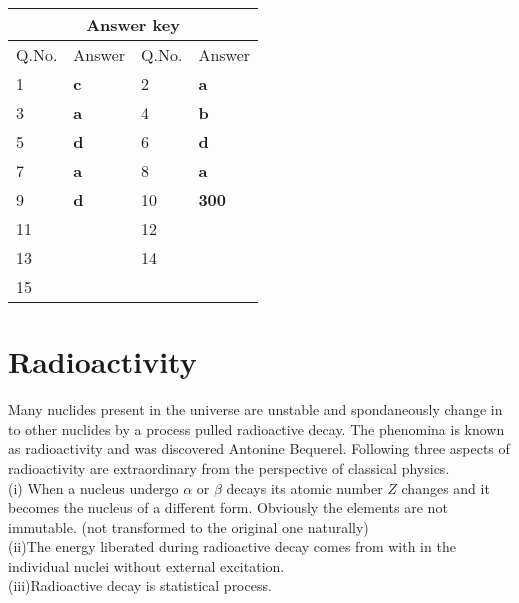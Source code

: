 \begin{table}[H]
	\centering
	\begin{tabular}{|p{1.5cm}|p{1.5cm}||p{1.5cm}|p{1.5cm}|}
		\hline
		\multicolumn{4}{|c|}{\textbf{Answer key}}\\\hline\hline
		\rowcolor{ocrel}Q.No.&Answer&Q.No.&Answer\\\hline
		1&\textbf{c} &2&\textbf{a}\\\hline 
		3&\textbf{a} &4&\textbf{b} \\\hline
		5&\textbf{d} &6&\textbf{d} \\\hline
		7&\textbf{a}&8&\textbf{a}\\\hline
		9&\textbf{d}&10&\textbf{300}\\\hline
		11&\textbf{} &12&\textbf{}\\\hline
		13&\textbf{}&14&\textbf{}\\\hline
		15&\textbf{}& &\\\hline
	\end{tabular}
\end{table}












\newpage
\section{Radioactivity}
Many nuclides present in the universe are unstable and spondaneously change in to other nuclides by a process pulled radioactive decay. The phenomina is known as radioactivity and was discovered Antonine Bequerel. Following three aspects of radioactivity are extraordinary from the perspective of classical physics.\\
(i) \quad When a nucleus undergo $\alpha$ or $\beta$ decays its atomic number $Z$ changes and it becomes the nucleus of a different form. Obviously the elements are not immutable. (not transformed to the original one naturally)\\
(ii)\quad The energy liberated during radioactive decay comes from with in the individual nuclei without external excitation.\\
(iii)\quad Radioactive decay is statistical process.
